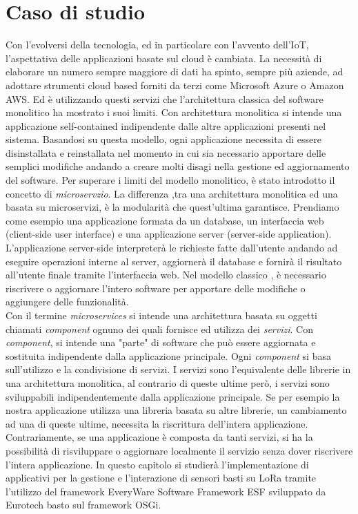 \chapter{Caso di studio}
Con l'evolversi della tecnologia, ed in particolare con l'avvento dell'IoT,
l'aspettativa delle applicazioni basate sul cloud è cambiata. La necessità di
elaborare un numero sempre maggiore di dati ha spinto, sempre più aziende, ad
adottare strumenti cloud based forniti da terzi come Microsoft Azure o Amazon
AWS.  Ed è utilizzando questi servizi  che l'architettura classica del
software monolitico ha mostrato i suoi limiti. Con architettura monolitica si
intende una applicazione self-contained indipendente dalle altre
applicazioni presenti nel sistema.  Basandosi su questa modello, ogni
applicazione necessita di essere disinstallata e reinstallata nel momento in cui
sia necessario apportare delle semplici modifiche andando a creare molti disagi
nella gestione ed aggiornamento del software.  Per superare i limiti del
modello monolitico, è stato introdotto il concetto di 
\emph{microservzio}.  La differenza ,tra una architettura monolitica ed una
basata su microservizi, è la  modularità che quest'ultima garantisce.  Prendiamo
come esempio una applicazione formata da un database, un interfaccia web
(client-side user interface)  e una applicazione server (server-side
application).  L'applicazione server-side interpreterà le richieste fatte
dall'utente andando ad eseguire operazioni interne al server, aggiornerà il
database e fornirà il risultato all'utente finale tramite l'interfaccia web.
Nel modello classico , è 
necessario riscrivere o aggiornare l'intero software per apportare delle
modifiche o aggiungere delle funzionalità.\\ Con il termine \emph{microservices}
si intende una architettura basata su oggetti chiamati \emph{component} ognuno
dei quali fornisce ed utilizza dei \emph{servizi}.  Con \textit{component}, si intende
una "parte" di software che può essere aggiornata e sostituita indipendente
dalla applicazione principale.  Ogni \emph{component} si basa sull'utilizzo e la
condivisione di servizi.  I servizi sono l'equivalente delle librerie in una
architettura monolitica, al contrario di queste ultime però, i servizi sono
sviluppabili indipendentemente dalla applicazione principale. Se per esempio la
nostra applicazione utilizza una libreria basata su  altre librerie, un
cambiamento ad una di queste ultime, necessita la riscrittura dell'intera
applicazione.  Contrariamente, se una applicazione è composta da tanti servizi,
si ha la possibilità di risviluppare o aggiornare localmente il servizio senza
dover riscrivere l'intera applicazione. In questo capitolo si studierà
l'implementazione di applicativi per la gestione e l'interazione di sensori
basti su LoRa tramite l'utilizzo del framework EveryWare Software Framework ESF
sviluppato da Eurotech basto sul framework OSGi.
